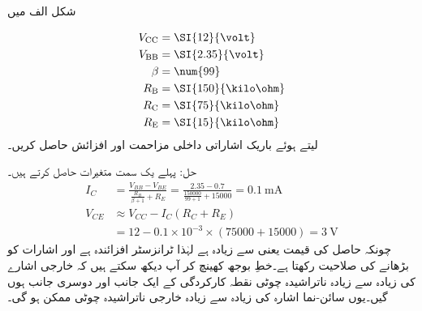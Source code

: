  
شکل  الف میں

\begin{align*}
V_{\textup{CC}}&=\SI{12}{\volt}\\
V_{\textup{BB}}&=\SI{2.35}{\volt}\\
\beta &=\num{99}\\
R_{\textup{B}}&=\SI{150}{\kilo \ohm}\\
R_{\textup {C}}&=\SI{75}{\kilo \ohm}\\
R_{\textup {E}}&=\SI{15}{\kilo \ohm}\
\end{align*}
لیتے ہوئے باریک اشاراتی داخلی مزاحمت   اور افزائش  حاصل کریں۔


حل:	پہلے یک سمت متغیرات حاصل کرتے ہیں۔
\begin{align*}
I_C&=\frac{V_{BB}-V_{BE}}{\frac{R_B}{\beta+1}+R_E}=\frac{2.35-0.7}{\frac{150000}{99+1}+15000}=\SI{0.1}{\milli \ampere}\\
V_{CE} &\approx V_{CC}-I_C \left(R_C+R_E \right )\\
&=12-0.1 \times 10^{-3} \times \left(75000+15000 \right )=\SI{3}{\volt}
\end{align*}
چونکہ حاصل   کی قیمت  یعنی    سے زیادہ ہے لہٰذا ٹرانزسٹر افزائندہ ہے اور اشارات کو بڑھانے کی صلاحیت رکھتا ہے۔خطِ بوجھ کھینچ کر آپ دیکھ سکتے ہیں کہ خارجی اشارے کی زیادہ سے زیادہ ناتراشیدہ چوٹی نقطہ کارکردگی کے ایک جانب  اور دوسری جانب  ہوں گیں۔یوں سائن-نما اشارہ کی زیادہ سے زیادہ خارجی ناتراشیدہ چوٹی  ممکن ہو گی۔ 

